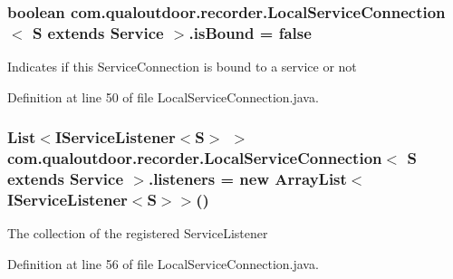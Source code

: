 \hypertarget{classcom_1_1qualoutdoor_1_1recorder_1_1LocalServiceConnection_3_01S_01extends_01Service_01_4_adf9f940effc914553eeb998f16c1cb91}{
\subsubsection[{is\-Bound}]{\setlength{\rightskip}{0pt plus 5cm}boolean com.\-qualoutdoor.\-recorder.\-Local\-Service\-Connection$<$ S extends Service $>$.is\-Bound = false\hspace{0.3cm}{\ttfamily [private]}}}\label{classcom_1_1qualoutdoor_1_1recorder_1_1LocalServiceConnection_3_01S_01extends_01Service_01_4_adf9f940effc914553eeb998f16c1cb91}
Indicates if this Service\-Connection is bound to a service or not 

Definition at line 50 of file Local\-Service\-Connection.\-java.

\hypertarget{classcom_1_1qualoutdoor_1_1recorder_1_1LocalServiceConnection_3_01S_01extends_01Service_01_4_ac1fcabe717a95d21e5aa9ec6165222fa}{
\subsubsection[{listeners}]{\setlength{\rightskip}{0pt plus 5cm}List$<$I\-Service\-Listener$<$S$>$ $>$ com.\-qualoutdoor.\-recorder.\-Local\-Service\-Connection$<$ S extends Service $>$.listeners = new Array\-List$<$I\-Service\-Listener$<$S$>$$>$()\hspace{0.3cm}{\ttfamily [private]}}}\label{classcom_1_1qualoutdoor_1_1recorder_1_1LocalServiceConnection_3_01S_01extends_01Service_01_4_ac1fcabe717a95d21e5aa9ec6165222fa}
The collection of the registered Service\-Listener 

Definition at line 56 of file Local\-Service\-Connection.\-java.

